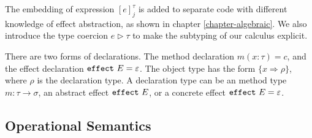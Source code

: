 The embedding of expression $[e]^\tau_j$ is added to separate code with different knowledge of effect abstraction, as shown in chapter \ref{chapter-algebraic}. We also introduce the type coercion $e \rhd \tau$ to make the subtyping of our calculus explicit. 

There are two forms of declarations. The method declaration $m(x:\tau) = c$, and the effect declaration $\mathtt{effect}~ E = \varepsilon$. The object type has the form $\{x \Rightarrow \rho\}$, where $\rho$ is the declaration type. A declaration type can be an method type $m : \tau \rightarrow \sigma$, an abstract effect $\mathtt{effect}~ E$, or a concrete effect $\mathtt{effect}~ E = \varepsilon$. 

\subsection{Operational Semantics}
